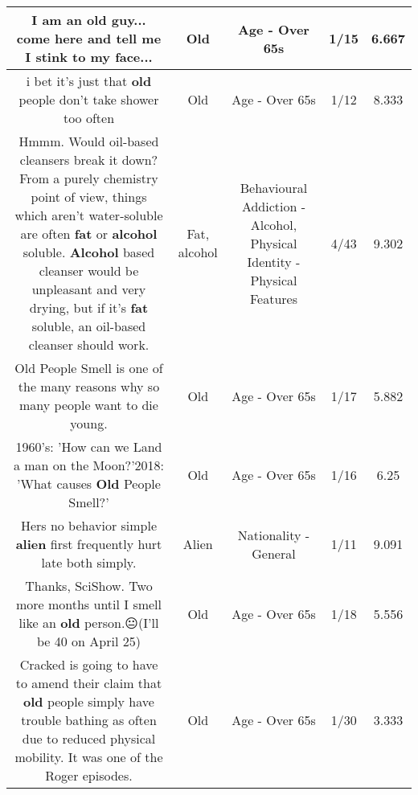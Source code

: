 \documentclass[11pt]{article}
\newlength\mylength
\begin{document}
\begin{center}
\begin{longtable}{|C{.65\mylength}|C{.30\mylength}|C{.12\mylength}|C{.12\mylength}|C{.12\mylength}|}
  \small I am an \textbf{old} guy... come here and tell me I stink to my face...\normalsize   & Old & Age - Over 65s & 1/15 & 6.667 \\  \hline
  \small i bet it's just that \textbf{old} people don't take shower too often\normalsize   & Old & Age - Over 65s & 1/12 & 8.333 \\  \hline
  \small Hmmm. Would oil-based cleansers break it down? From a purely chemistry point of view, things which aren't water-soluble are often \textbf{fat} or \textbf{alcohol} soluble. \textbf{Alcohol} based cleanser would be unpleasant and very drying, but if it's \textbf{fat} soluble, an oil-based cleanser should work.\normalsize   & Fat, alcohol & Behavioural Addiction - Alcohol, Physical Identity - Physical Features & 4/43 & 9.302 \\  \hline
  \small Old People Smell is one of the many reasons why so many people want to die young.\normalsize   & Old & Age - Over 65s & 1/17 & 5.882 \\  \hline
  \small 1960's: 'How can we Land a man on the Moon?'2018: 'What causes \textbf{Old} People Smell?'\normalsize   & Old & Age - Over 65s & 1/16 & 6.25 \\  \hline
  \small Hers no behavior simple \textbf{alien} first frequently hurt late both simply.\normalsize   & Alien & Nationality - General & 1/11 & 9.091 \\  \hline
  \small Thanks, SciShow. Two more months until I smell like an \textbf{old} person.😐(I'll be 40 on April 25)\normalsize   & Old & Age - Over 65s & 1/18 & 5.556 \\  \hline
  \small Cracked is going to have to amend their claim that \textbf{old} people simply have trouble bathing as often due to reduced physical mobility. It was one of the Roger episodes.\normalsize   & Old & Age - Over 65s & 1/30 & 3.333 \\  \hline

\end{longtable}
\end{center}
\end{document}
